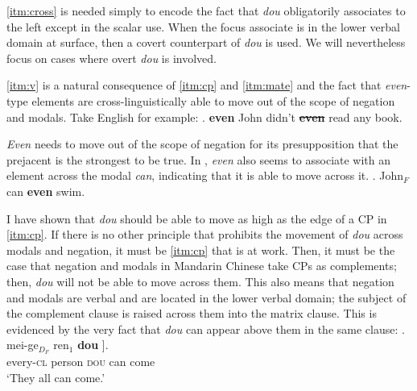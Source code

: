 \documentclass[12pt]{article}
\let\latextextsubscript\textsubscript
\let\textsubscript\latextextsubscript
\newcommand{\gap}[1]{\rule{1em}{0.4pt}\textsubscript{#1}}
\begin{document}
\cref{itm:cross} is needed simply to encode the fact that \emph{dou} obligatorily associates to the left except in the scalar use.
When the focus associate is in the lower verbal domain at surface, then a covert counterpart of \emph{dou} is used.
We will nevertheless focus on cases where overt \emph{dou} is involved.


\cref{itm:v} is a natural consequence of \cref{itm:cp} and \cref{itm:mate} and the fact that \emph{even}-type elements are cross-linguistically able to move out of the scope of negation and modals.
Take English for example:
\ex. \textbf{even} John didn't \textbf{\sout{even}} read any book.

\emph{Even} needs to move out of the scope of negation for its presupposition that the prejacent is the strongest to be true.
In \Next, \emph{even} also seems to associate with an element across the modal \emph{can}, indicating that it is able to move across it.
\ex. John\(_F\) can \textbf{even} swim.


I have shown that \emph{dou} should be able to move as high as the edge of a CP in \cref{itm:cp}.
If there is no other principle that prohibits the movement of \emph{dou} across modals and negation, it must be \cref{itm:cp} that is at work.
Then, it must be the case that negation and modals in Mandarin Chinese take CPs as complements; then, \emph{dou} will not be able to move across them.
This also means that negation and modals are verbal and are located in the lower verbal domain; the subject of the complement clause is raised across them into the matrix clause.
This is evidenced by the very fact that \emph{dou} can appear above them in the same clause:
\ex. \gll 
mei-ge\(_{D_F}\) ren\(_1\) \textbf{dou} \I[VP keyi \I[CP \gap{1} lai ]]. \\
every-\textsc{cl} person \textsc{dou} {} can {} {} come \\
\glt `They all can come.'
\end{document}
